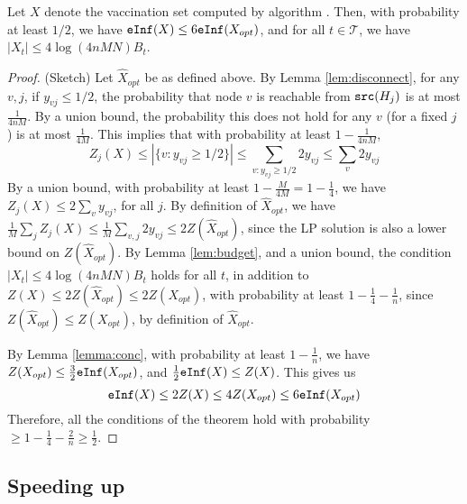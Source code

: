 \begin{theorem}
\label{theorem:algo}
Let $X$ denote the vaccination set computed by algorithm \algo{}.
Then, with probability at least $1/2$, we have
$\texttt{eInf}(X)\leq 6\texttt{eInf}(X_{opt})$, and for all $t\in\mathcal{T}$, we have
$|X_t|\leq 4\log(4nMN)B_t$.
\end{theorem}
\begin{proof} (Sketch)
Let $\hat{X}_{opt}$ be as defined above. 
By Lemma \ref{lem:disconnect}, for any $v, j$, if $y_{vj} \leq 1/2$, the probability that node $v$ is
reachable from $\texttt{src}(H_j)$ is at most $\frac{1}{4nM}$.
By a union bound, the probability this does not hold for any $v$ (for a fixed $j$) is at most $\frac{1}{4M}$.
This implies that with probability at least $1-\frac{1}{4nM}$, 
\[
Z_j(X)\leq |\{v: y_{vj}\geq 1/2\}|\leq \sum_{v: y_{vj}\geq 1/2} 2y_{vj} \leq \sum_v 2y_{vj}
\]
By a union bound, with probability at least $1-\frac{M}{4M}=1-\frac{1}{4}$,
we have $Z_j(X)\leq 2\sum_v y_{vj}$, for all $j$.
By definition of $\hat{X}_{opt}$, we have $\frac{1}{M}\sum_j Z_j(X)\leq \frac{1}{M}\sum_{v,j} 2y_{vj} \leq 2Z(\hat{X}_{opt})$,
since the LP solution is also a lower bound on $Z(\hat{X}_{opt})$.
By Lemma \ref{lem:budget}, and a union bound, the condition $|X_t|\leq 4\log(4nMN)B_t$ holds for all $t$,
in addition to $Z(X)\leq 2Z(\hat{X}_{opt})\leq 2Z(X_{opt})$, with probability at least $1-\frac{1}{4}-\frac{1}{n}$,
since $Z(\hat{X}_{opt})\leq Z(X_{opt})$, by definition of $\hat{X}_{opt}$.

By Lemma \ref{lemma:conc}, with probability at least $1-\frac{1}{n}$,
we have $Z(X_{opt})\leq \frac{3}{2}\texttt{eInf}(X_{opt})$, and
$\frac{1}{2}\texttt{eInf}(X)\leq Z(X)$. This gives us
\[
\texttt{eInf}(X)\leq 2Z(X)\leq 4Z(X_{opt})\leq 6\texttt{eInf}(X_{opt})
\]
Therefore, all the conditions of the theorem hold with probability $\geq 1-\frac{1}{4}-\frac{2}{n}\geq \frac{1}{2}$.
\end{proof}


\subsection{Speeding up \algo{}}

